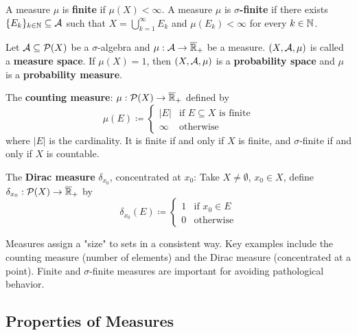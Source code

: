 \begin{definition}
A measure $\mu$ is \textbf{finite} if $\mu(X) < \infty$.
A measure $\mu$ is \textbf{$\sigma$-finite} if there exists $\{E_k\}_{k \in \mathbb{N}} \subseteq \mathcal{A}$ such that $X = \bigcup_{k=1}^{\infty} E_k$ and $\mu(E_k) < \infty$ for every $k \in \mathbb{N}$.
\end{definition}

\begin{definition}
Let $\mathcal{A} \subseteq \mathcal{P}(X)$ be a $\sigma$-algebra and $\mu: \mathcal{A} \to \overline{\mathbb{R}}_+$ be a measure.
$(X, \mathcal{A}, \mu)$ is called a \textbf{measure space}.
If $\mu(X) = 1$, then $(X, \mathcal{A}, \mu)$ is a \textbf{probability space} and $\mu$ is a \textbf{probability measure}.
\end{definition}

\begin{example}
The \textbf{counting measure}:
$\mu: \mathcal{P}(X) \to \overline{\mathbb{R}}_+$ defined by
\[
\mu(E) \coloneqq
\begin{cases}
|E| & \text{if } E \subseteq X \text{ is finite} \\
\infty & \text{otherwise}
\end{cases}
\]
where $|E|$ is the cardinality.
It is finite if and only if $X$ is finite, and $\sigma$-finite if and only if $X$ is countable.

The \textbf{Dirac measure} $\delta_{x_0}$, concentrated at $x_0$:
Take $X \neq \emptyset$, $x_0 \in X$, define $\delta_{x_0}: \mathcal{P}(X) \to \overline{\mathbb{R}}_+$ by
\[
\delta_{x_0}(E) \coloneqq
\begin{cases}
1 & \text{if } x_0 \in E \\
0 & \text{otherwise}
\end{cases}
\]
\end{example}

\begin{remark}
Measures assign a "size" to sets in a consistent way. Key examples include the counting measure (number of elements) and the Dirac measure (concentrated at a point). Finite and $\sigma$-finite measures are important for avoiding pathological behavior.
\end{remark}

\clearpage
\subsection{Properties of Measures}

